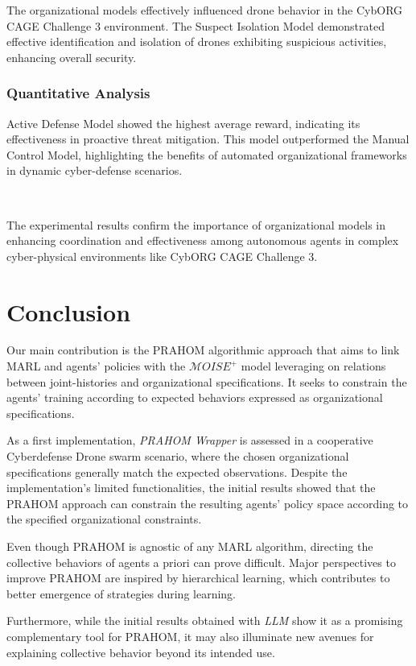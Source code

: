 \documentclass[conference]{IEEEtran}
\newcounter{relation}
\begin{document}
The organizational models effectively influenced drone behavior in the CybORG CAGE Challenge 3 environment. The Suspect Isolation Model demonstrated effective identification and isolation of drones exhibiting suspicious activities, enhancing overall security.

\subsubsection{Quantitative Analysis}

{Active Defense Model} showed the highest average reward, indicating its effectiveness in proactive threat mitigation. This model outperformed the Manual Control Model, highlighting the benefits of automated organizational frameworks in dynamic cyber-defense scenarios.

\

The experimental results confirm the importance of organizational models in enhancing coordination and effectiveness among autonomous agents in complex cyber-physical environments like CybORG CAGE Challenge 3.



\section{Conclusion}\label{sec:conclusion}

Our main contribution is the PRAHOM algorithmic approach that aims to link MARL and agents' policies with the $\mathcal{M}OISE^+$ model leveraging on relations between joint-histories and organizational specifications. It seeks to constrain the agents' training according to expected behaviors expressed as organizational specifications.

As a first implementation, \emph{PRAHOM Wrapper} is assessed in a cooperative Cyberdefense Drone swarm scenario, where the chosen organizational specifications generally match the expected observations. Despite the implementation's limited functionalities, the initial results showed that the PRAHOM approach can constrain the resulting agents' policy space according to the specified organizational constraints.

Even though PRAHOM is agnostic of any MARL algorithm, directing the collective behaviors of agents a priori can prove difficult. Major perspectives to improve PRAHOM are inspired by hierarchical learning, which contributes to better emergence of strategies during learning.

Furthermore, while the initial results obtained with \emph{LLM} show it as a promising complementary tool for PRAHOM, it may also illuminate new avenues for explaining collective behavior beyond its intended use.
\end{document}
